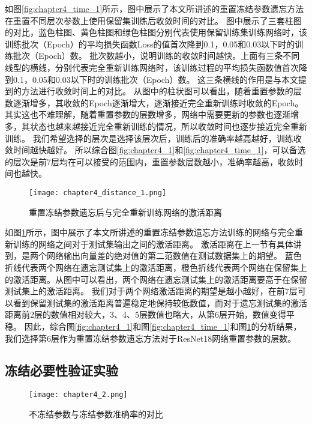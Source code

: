 如图\ref{fig:chapter4_time_1}所示，图中展示了本文所讲述的重置冻结参数遗忘方法在重置不同层次参数上使用保留集训练后收敛时间的对比。
图中展示了三套柱图的对比，蓝色柱图、黄色柱图和绿色柱图分别代表使用保留训练集训练网络时，该训练批次（Epoch）的平均损失函数Loss的值首次降到0.1，0.05和0.03以下时的训练批次（Epoch）数。
批次数越小，说明训练的收敛时间越快。上面有三条不同线型的横线，分别代表完全重新训练网络时，该训练过程的平均损失函数值首次降到0.1，0.05和0.03以下时的训练批次（Epoch）数。
这三条横线的作用是与本文提到的方法进行收敛时间上的对比。
从图中的柱状图可以看出，随着重置参数的层数逐渐增多，其收敛的Epoch逐渐增大，逐渐接近完全重新训练时收敛的Epoch。
其实这也不难理解，随着重置参数的层数增多，网络中需要更新的参数也逐渐增多，其状态也越来越接近完全重新训练的情况，所以收敛时间也逐步接近完全重新训练。
我们希望选择的层次是选择该层次后，训练后的准确率越高越好，训练收敛时间越快越好。
所以综合图\ref{fig:chapter4_1}和\ref{fig:chapter4_time_1}，可以备选的层次是前7层均在可以接受的范围内，重置参数层数越小，准确率越高，收敛时间也越快。
\begin{figure}
    \centering
    \texttt{[image: chapter4\_distance\_1.png]}
    \caption{重置冻结参数遗忘后与完全重新训练网络的激活距离}
    \label{fig:chapter4_distance_1}
\end{figure}

如图\ref{fig:chapter4_distance_1}所示，图中展示了本文所讲述的重置冻结参数遗忘方法训练的网络与完全重新训练的网络之间对于测试集输出之间的激活距离。
激活距离在上一节有具体讲到，是两个网络输出向量差的绝对值的第二范数值在测试数据集上的期望。
蓝色折线代表两个网络在遗忘测试集上的激活距离，橙色折线代表两个网络在保留集上的激活距离。从图中可以看出，两个网络在遗忘测试集上的激活距离要高于在保留测试集上的激活距离。
我们对于两个网络激活距离的期望是越小越好，在前7层可以看到保留测试集的激活距离普遍稳定地保持较低数值，而对于遗忘测试集的激活距离前2层的数值相对较大，3、4、5层数值也略大，从第6层开始，数值变得平稳。
因此，综合图\ref{fig:chapter4_1}和图\ref{fig:chapter4_time_1}和图\ref{fig:chapter4_distance_1}的分析结果，我们选择第6层作为重置冻结参数遗忘方法对于ResNet18网络重置参数的层数。
\subsection{冻结必要性验证实验}
\begin{figure}
    \centering
    \texttt{[image: chapter4\_2.png]}
    \caption{不冻结参数与冻结参数准确率的对比}
    \label{fig:chapter4_2}
\end{figure}

